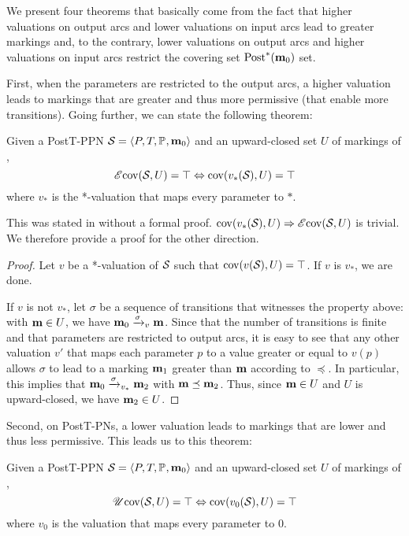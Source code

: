 We present four theorems that basically come from the fact that
higher valuations on output arcs and lower valuations on input arcs lead to greater markings and, to the contrary,
lower valuations on output arcs and higher valuations on input arcs restrict the covering set $\operatorname{Post}^*_{{}}(\mathbf{m}_0)$ set.

First, when the parameters are restricted to the output arcs, a higher valuation leads to markings that are greater and thus more permissive (\ie that enable more transitions).
Going further, we can state the following theorem:
\begin{theo}
  \label{theo:post-e-star-val}
  Given a PostT-\ac{PPN} $\defPPN$ and an upward-closed set $U$ of markings of \namePPN, \[\operatorname{\mathscr{E}cov}(\mathcal{S}_{{}}, U) = \top \Leftrightarrow \operatorname{cov}(v_*(\mathcal{S}_{{}}),U) = \top\] where $v_*$ is the *-valuation that maps every parameter to $*$.
\end{theo}

This was stated in \cite{David17} without a formal proof.
$\operatorname{cov}(v_*(\mathcal{S}_{{}}),U) \Rightarrow \operatorname{\mathscr{E}cov}(\mathcal{S}_{{}}, U)$ is trivial.
We therefore provide a proof for the other direction.


\begin{proof}
  Let $v$ be a *-valuation of $\mathcal{S}_{{}}$ such that $\operatorname{cov}(v(\mathcal{S}_{{}}),U) = \top$.
  If $v$ is $v_*$, we are done.

  If $v$ is not $v_*$, let $\sigma$ be a sequence of transitions that witnesses the property above: with $\mathbf{m} \in U$, we have $\mari \fire[\val]{\sigma} \mar$.
  Since that the number of transitions is finite and that parameters are restricted to output arcs, it is easy to see that any other valuation $v'$ that maps each parameter $p$ to a value greater or equal to $v(p)$ allows $\sigma$ to lead to a marking $\mathbf{m}_1$ greater than $\mathbf{m}$ according to $\preceq$.
  In particular, this implies that $\mari \fire[\val_*]{\sigma} \mar_2$ with $\mathbf{m} \preceq \mathbf{m}_2$.
  Thus, since $\mathbf{m} \in U$ and $U$ is upward-closed, we have $\mathbf{m}_2 \in U$.
\end{proof}

Second, on PostT-\acp{PN}, a lower valuation leads to markings that are lower and thus less permissive.
This leads us to this theorem:
\begin{theo}
  \label{theo:post-u-zero-val}
  Given a PostT-\ac{PPN} $\defPPN$ and an upward-closed set $U$ of markings of \namePPN, \[\operatorname{\mathscr{U}cov}(\mathcal{S}_{{}}, U) = \top \Leftrightarrow \operatorname{cov}(v_0(\mathcal{S}_{{}}),U) = \top\] where $v_0$ is the valuation that maps every parameter to $0$.
\end{theo}

